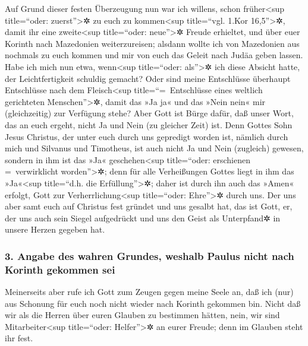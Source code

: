  Auf Grund dieser festen Überzeugung nun war ich willens,
schon früher\textless sup title=``oder: zuerst''\textgreater✲ zu euch zu
kommen\textless sup title=``vgl. 1.Kor 16,5''\textgreater✲, damit ihr
eine zweite\textless sup title=``oder: neue''\textgreater✲ Freude
erhieltet,  und über euer Korinth nach Mazedonien
weiterzureisen; alsdann wollte ich von Mazedonien aus nochmals zu euch
kommen und mir von euch das Geleit nach Judäa geben lassen.
 Habe ich mich nun etwa, wenn\textless sup title=``oder:
als''\textgreater✲ ich diese Absicht hatte, der Leichtfertigkeit
schuldig gemacht? Oder sind meine Entschlüsse überhaupt Entschlüsse nach
dem Fleisch\textless sup title=``=~Entschlüsse eines weltlich
gerichteten Menschen''\textgreater✲, damit das »Ja ja« und das »Nein
nein« mir (gleichzeitig) zur Verfügung stehe?  Aber Gott
ist Bürge dafür, daß unser Wort, das an euch ergeht, nicht Ja und Nein
(zu gleicher Zeit) ist.  Denn Gottes Sohn Jesus Christus,
der unter euch durch uns gepredigt worden ist, nämlich durch mich und
Silvanus und Timotheus, ist auch nicht Ja und Nein (zugleich) gewesen,
sondern in ihm ist das »Ja« geschehen\textless sup title=``oder:
erschienen =~verwirklicht worden''\textgreater✲;  denn
für alle Verheißungen Gottes liegt in ihm das »Ja«\textless sup
title=``d.h. die Erfüllung''\textgreater✲; daher ist durch ihn auch das
»Amen« erfolgt, Gott zur Verherrlichung\textless sup title=``oder:
Ehre''\textgreater✲ durch uns.  Der uns aber samt euch
auf Christus fest gründet und uns gesalbt hat, das ist Gott,
 er, der uns auch sein Siegel aufgedrückt und uns den
Geist als Unterpfand✲ in unsere Herzen gegeben hat.

\hypertarget{angabe-des-wahren-grundes-weshalb-paulus-nicht-nach-korinth-gekommen-sei}{%
\subsubsection{3. Angabe des wahren Grundes, weshalb Paulus nicht nach
Korinth gekommen
sei}\label{angabe-des-wahren-grundes-weshalb-paulus-nicht-nach-korinth-gekommen-sei}}

 Meinerseits aber rufe ich Gott zum Zeugen gegen meine
Seele an, daß ich (nur) aus Schonung für euch noch nicht wieder nach
Korinth gekommen bin.  Nicht daß wir als die Herren über
euren Glauben zu bestimmen hätten, nein, wir sind
Mitarbeiter\textless sup title=``oder: Helfer''\textgreater✲ an eurer
Freude; denn im Glauben steht ihr fest.


